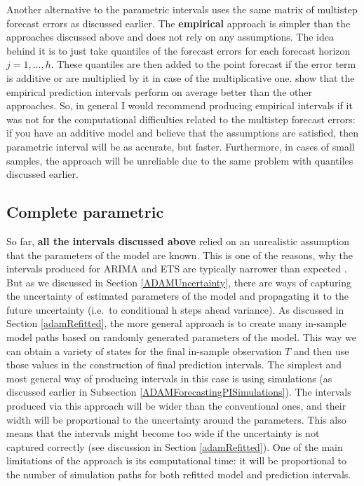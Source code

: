 \documentclass[
]{book}
\theoremstyle{definition}
\theoremstyle{definition}
\theoremstyle{definition}
\theoremstyle{definition}
\theoremstyle{remark}
\begin{document}
Another alternative to the parametric intervals uses the same matrix of multistep forecast errors as discussed earlier. The \textbf{empirical} approach is simpler than the approaches discussed above and does not rely on any assumptions. The idea behind it is to just take quantiles of the forecast errors for each forecast horizon \(j=1,\dots,h\). These quantiles are then added to the point forecast if the error term is additive or are multiplied by it in case of the multiplicative one. \citet{Kourentzes2021TBA} show that the empirical prediction intervals perform on average better than the other approaches. So, in general I would recommend producing empirical intervals if it was not for the computational difficulties related to the multistep forecast errors: if you have an additive model and believe that the assumptions are satisfied, then parametric interval will be as accurate, but faster. Furthermore, in cases of small samples, the approach will be unreliable due to the same problem with quantiles discussed earlier.

\hypertarget{complete-parametric}{%
\subsection{Complete parametric}\label{complete-parametric}}

So far, \textbf{all the intervals discussed above} relied on an unrealistic assumption that the parameters of the model are known. This is one of the reasons, why the intervals produced for ARIMA and ETS are typically narrower than expected \citep[see, for example results of competition in][]{Athanasopoulos2011}. But as we discussed in Section \ref{ADAMUncertainty}, there are ways of capturing the uncertainty of estimated parameters of the model and propagating it to the future uncertainty (i.e.~to conditional h steps ahead variance). As discussed in Section \ref{adamRefitted}, the more general approach is to create many in-sample model paths based on randomly generated parameters of the model. This way we can obtain a variety of states for the final in-sample observation \(T\) and then use those values in the construction of final prediction intervals. The simplest and most general way of producing intervals in this case is using simulations (as discussed earlier in Subsection \ref{ADAMForecastingPISimulations}). The intervals produced via this approach will be wider than the conventional ones, and their width will be proportional to the uncertainty around the parameters. This also means that the intervals might become too wide if the uncertainty is not captured correctly (see discussion in Section \ref{adamRefitted}). One of the main limitations of the approach is its computational time: it will be proportional to the number of simulation paths for both refitted model and prediction intervals.
\end{document}
